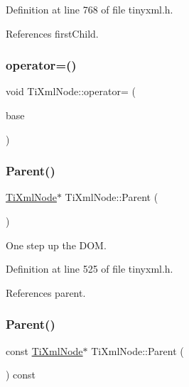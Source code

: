 Definition at line 768 of file tinyxml.\+h.



References first\+Child.

\hypertarget{class_ti_xml_node_a9eb62a8d95b8a98ec2df481cc9e5a7e2}{}\label{class_ti_xml_node_a9eb62a8d95b8a98ec2df481cc9e5a7e2} 
\subsubsection{\texorpdfstring{operator=()}{operator=()}}
{\footnotesize\ttfamily void Ti\+Xml\+Node\+::operator= (\begin{DoxyParamCaption}\item[{const \hyperlink{class_ti_xml_node}{Ti\+Xml\+Node} \&}]{base }\end{DoxyParamCaption})\hspace{0.3cm}{\ttfamily [private]}}

\hypertarget{class_ti_xml_node_ab643043132ffd794f8602685d34a982e}{}\label{class_ti_xml_node_ab643043132ffd794f8602685d34a982e} 
\subsubsection{\texorpdfstring{Parent()}{Parent()}\hspace{0.1cm}{\footnotesize\ttfamily [1/2]}}
{\footnotesize\ttfamily \hyperlink{class_ti_xml_node}{Ti\+Xml\+Node}$\ast$ Ti\+Xml\+Node\+::\+Parent (\begin{DoxyParamCaption}{ }\end{DoxyParamCaption})\hspace{0.3cm}{\ttfamily [inline]}}



One step up the D\+OM. 



Definition at line 525 of file tinyxml.\+h.



References parent.

\hypertarget{class_ti_xml_node_af13df38878a5798142693d01d6133ba0}{}\label{class_ti_xml_node_af13df38878a5798142693d01d6133ba0} 
\subsubsection{\texorpdfstring{Parent()}{Parent()}\hspace{0.1cm}{\footnotesize\ttfamily [2/2]}}
{\footnotesize\ttfamily const \hyperlink{class_ti_xml_node}{Ti\+Xml\+Node}$\ast$ Ti\+Xml\+Node\+::\+Parent (\begin{DoxyParamCaption}{ }\end{DoxyParamCaption}) const\hspace{0.3cm}{\ttfamily [inline]}}



